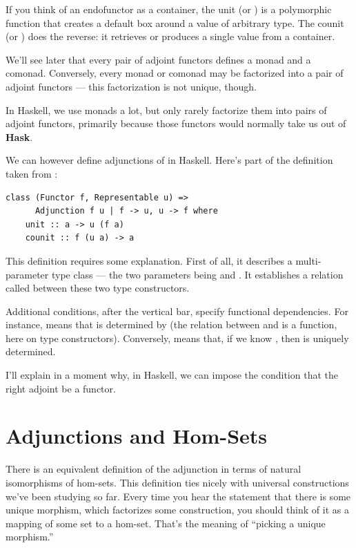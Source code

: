 If you think of an endofunctor as a container, the unit (or
) is a polymorphic function that creates a default box
around a value of arbitrary type. The counit (or ) does
the reverse: it retrieves or produces a single value from a container.

We'll see later that every pair of adjoint functors defines a monad and
a comonad. Conversely, every monad or comonad may be factorized into a
pair of adjoint functors --- this factorization is not unique, though.

In Haskell, we use monads a lot, but only rarely factorize them into
pairs of adjoint functors, primarily because those functors would
normally take us out of \textbf{Hask}.

We can however define adjunctions of  in Haskell.
Here's part of the definition taken from
:

\begin{Verbatim}[commandchars=\\\{\}]
class (Functor f, Representable u) =>
      Adjunction f u | f -> u, u -> f where
    unit :: a -> u (f a)
    counit :: f (u a) -> a
\end{Verbatim}
This definition requires some explanation. First of all, it describes a
multi-parameter type class --- the two parameters being  and
. It establishes a relation called  between
these two type constructors.

Additional conditions, after the vertical bar, specify functional
dependencies. For instance,  means that
 is determined by  (the relation between 
and  is a function, here on type constructors). Conversely,
 means that, if we know , then
 is uniquely determined.

I'll explain in a moment why, in Haskell, we can impose the condition
that the right adjoint  be a  functor.

\section{Adjunctions and Hom-Sets}\label{adjunctions-and-hom-sets}

There is an equivalent definition of the adjunction in terms of natural
isomorphisms of hom-sets. This definition ties nicely with universal
constructions we've been studying so far. Every time you hear the
statement that there is some unique morphism, which factorizes some
construction, you should think of it as a mapping of some set to a
hom-set. That's the meaning of ``picking a unique morphism.''


